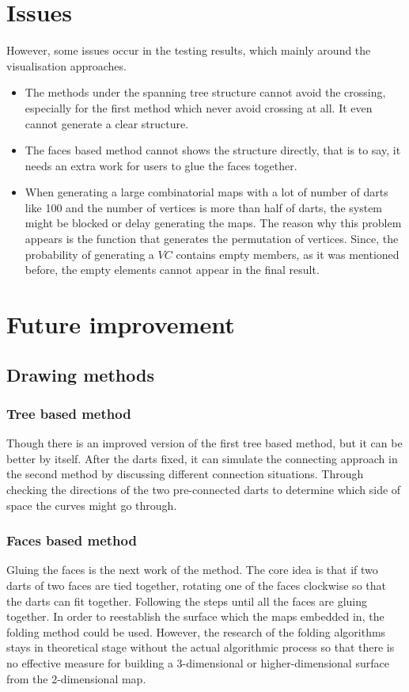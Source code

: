 \section{Issues}

However, some issues occur in the testing results, which mainly around the visualisation approaches.
\begin{itemize}
    \item The methods under the spanning tree structure cannot avoid the crossing, especially for the first method which never avoid crossing at all. It even cannot generate a clear structure.
    \item The faces based method cannot shows the structure directly, that is to say, it needs an extra work for users to glue the faces together.
    \item When generating a large combinatorial maps with a lot of number of darts like 100 and the number of vertices is more than half of darts, the system might be blocked or delay generating the maps. The reason why this problem appears is the function that generates the permutation of vertices. Since, the probability of generating a \(VC\) contains empty members, as it was mentioned before, the empty elements cannot appear in the final result.
\end{itemize}

\section{Future improvement}

\subsection{Drawing methods}

\subsubsection{Tree based method}
Though there is an improved version of the first tree based method, but it can be better by itself. After the darts fixed, it can simulate the connecting approach in the second method by discussing different connection situations.  Through checking the directions of the two pre-connected darts to determine which side of space the curves might go through.

\subsubsection{Faces based method}
Gluing the faces is the next work of the method. The core idea is that if two darts of two faces are tied together,  rotating one of the faces clockwise so that the darts can fit together. Following the steps until all the faces are gluing together. In order to reestablish the surface which the maps embedded in, the folding method could be used.  However, the research of the folding algorithms stays in theoretical stage without the actual algorithmic process\cite{demaine2005survey} so that there is no effective measure for building a 3-dimensional or higher-dimensional surface from the 2-dimensional map.

